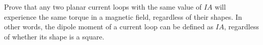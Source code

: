 Prove that any two planar current loops with the same
value of $IA$ will experience the same torque in a
magnetic field, regardless of their shapes. In other words,
the dipole moment of a current loop can be defined as
$IA$, regardless of whether its shape is a square.
